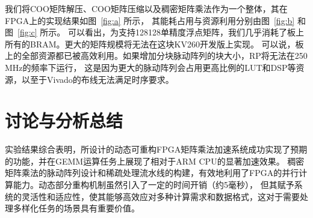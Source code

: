 我们将COO矩阵解压、COO矩阵压缩以及稠密矩阵乘法作为一个整体，其在FPGA上的实现结果如图~\ref{fig:a} 所示，
其能耗占用与资源利用分别由图~\ref{fig:b} 和图~\ref{fig:c} 所示。
可以看出，为支持128\texttimes{}128单精度浮点矩阵，我们几乎消耗了板上所有的BRAM。更大的矩阵规模将无法在这块KV260开发版上实现。
可以说，板上的全部资源都已被高效利用。如果增加分块脉动阵列的块大小，RP将无法在250 MHz的频率下运行，
这是因为更大的脉动阵列会占用更高比例的LUT和DSP等资源，以至于Vivado的布线无法满足时序要求。

\section{讨论与分析总结}

实验结果综合表明，所设计的动态可重构FPGA矩阵乘法加速系统成功实现了预期的功能，并在GEMM运算任务上展现了相对于ARM CPU的显著加速效果。
稠密矩阵乘法的脉动阵列设计和稀疏处理流水线的构建，有效地利用了FPGA的并行计算能力。动态部分重构机制虽然引入了一定的时间开销（约5毫秒），
但其赋予系统的灵活性和适应性，使其能够高效应对多种计算需求和数据格式，这对于需要处理多样化任务的场景具有重要价值。
